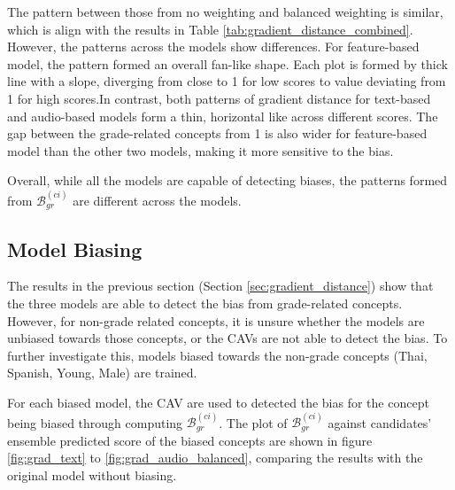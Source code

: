 The pattern between those from no weighting and balanced weighting is similar, which is align with the results in Table \ref{tab:gradient_distance_combined}. However, the patterns across the models show differences. For feature-based model, the pattern formed an overall fan-like shape. Each plot is formed by thick line with a slope, diverging from close to 1 for low scores to value deviating from 1 for high scores.In contrast, both patterns of gradient distance for text-based and audio-based models form a thin, horizontal like across different scores. The gap between the grade-related concepts from 1 is also wider for feature-based model than the other two models, making it more sensitive to the bias.

Overall, while all the models are capable of detecting biases, the patterns formed from $\mathcal{B}^{(ci)}_{gr}$ are different across the models.

\subsection{Model Biasing} \label{sec:model_biasing}
The results in the previous section (Section \ref{sec:gradient_distance}) show that the three models are able to detect the bias from grade-related concepts. However, for non-grade related concepts, it is unsure whether the models are unbiased towards those concepts, or the CAVs are not able to detect the bias. To further investigate this, models biased towards the non-grade concepts (Thai, Spanish, Young, Male) are trained.

For each biased model, the CAV are used to detected the bias for the concept being biased through computing $\mathcal{B}^{(ci)}_{gr}$. The plot of $\mathcal{B}^{(ci)}_{gr}$ against candidates’ ensemble predicted score of the biased concepts are shown in figure \ref{fig:grad_text} to \ref{fig:grad_audio_balanced}, comparing the results with the original model without biasing.

